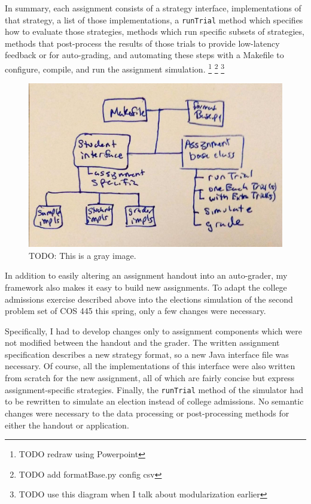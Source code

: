 \documentclass[pageno]{jpaper}
\begin{document}
In summary, each assignment consists of a strategy interface, implementations of that strategy, a list of those implementations, a \texttt{runTrial} method which specifies how to evaluate those strategies, methods which run specific subsets of strategies, methods that post-process the results of those trials to provide low-latency feedback or for auto-grading, and automating these steps with a Makefile to configure, compile, and run the assignment simulation.
\footnote{TODO redraw using Powerpoint}
\footnote{TODO add formatBase.py config csv}
\footnote{TODO use this diagram when I talk about modularization earlier}
\begin{figure}[hbt]
\centering
\includegraphics[width=0.75\linewidth]{Handwritten_Diagram.jpg}
\caption{TODO: This is a gray image.}\label{fig:gray}
\end{figure}

In addition to easily altering an assignment handout into an auto-grader, my framework also makes it easy to build new assignments.
To adapt the college admissions exercise described above into the elections simulation of the second problem set of COS 445 this spring, only a few changes were necessary.

Specifically, I had to develop changes only to assignment components which were not modified between the handout and the grader.
The written assignment specification describes a new strategy format, so a new Java interface file was necessary.
Of course, all the implementations of this interface were also written from scratch for the new assignment, all of which are fairly concise but express assignment-specific strategies.
Finally, the \texttt{runTrial} method of the simulator had to be rewritten to simulate an election instead of college admissions.
No semantic changes were necessary to the data processing or post-processing methods for either the handout or application.
\end{document}
